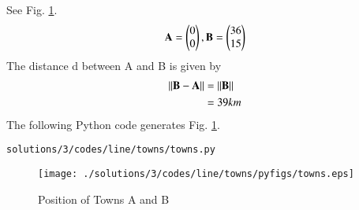 See Fig. \ref{fig:3.5.3_towns_py}.
\begin{align}
\mathbf{A}=\begin{pmatrix}0\\0\end{pmatrix}, 
\mathbf{B}=\begin{pmatrix}36\\15\end{pmatrix}
\end{align}
The distance d between A and B is given by
\begin{align}
 \left\lVert\mathbf{B}-\mathbf{A}\right\rVert &= \left\lVert\mathbf{B}\right\rVert
\\
&=39km
\end{align}
 The  following Python code generates Fig. \ref{fig:3.5.3_towns_py}.
%
\begin{lstlisting}
solutions/3/codes/line/towns/towns.py
\end{lstlisting}
\begin{figure}[!ht]
\centering
\texttt{[image: ./solutions/3/codes/line/towns/pyfigs/towns.eps]}
\caption{Position of Towns A and B}
\label{fig:3.5.3_towns_py}
\end{figure}
